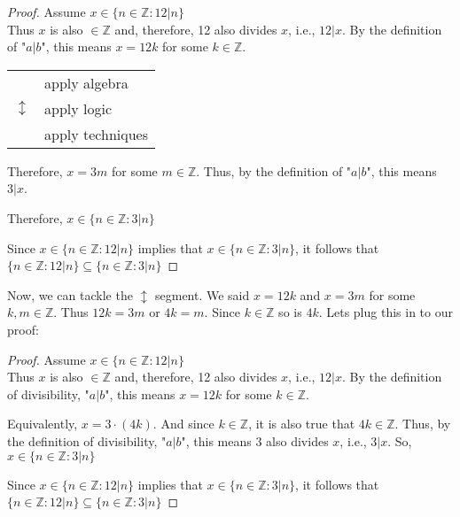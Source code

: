 \documentclass{amsart} %
\theoremstyle{definition} %
\theoremstyle{proposition} %
\theoremstyle{remark} %
\begin{document}
\begin{proof}
      Assume $x \in \{n \in \mathbb{Z}: 12|n \}$ \\
      Thus $x$ is also $\in \mathbb{Z}$ and, therefore, 12 also divides $x$, i.e., $12|x$. By the definition of "$a | b$", this means $x=12k$ for some $k \in \mathbb{Z}$.

      \begin{center}
      \begin{tabular}{r l}
            \multirow{3}{*}{\huge $\updownarrow$} & apply algebra \\ %
            & apply logic \\
            & apply techniques \\
      \end{tabular}
      \end{center}

      Therefore, $x = 3m$ for some $m \in \mathbb{Z}$. Thus, by the definition of "$a | b$", this means $3 | x$.

      Therefore, $x \in \{n \in \mathbb{Z} : 3|n \}$

      Since $x \in\{n \in \mathbb{Z}: 12|n \}$ implies that $x \in \{n \in \mathbb{Z} : 3|n \}$, it follows that \\ $\{n \in \mathbb{Z}: 12|n \} \subseteq \{n \in \mathbb{Z} : 3|n \}$

\end{proof}

Now, we can tackle the $\updownarrow$ segment. We said $x = 12k$ and $x = 3m$ for some $k, m \in \mathbb{Z}$. Thus $12k = 3m$ or $4k = m$. Since $k \in \mathbb{Z}$ so is $4k$. Lets plug this in to our proof:

\begin{proof}
      Assume $x \in \{n \in \mathbb{Z}: 12|n \}$ \\
      Thus $x$ is also $\in \mathbb{Z}$ and, therefore, 12 also divides $x$, i.e., $12|x$. By the definition of divisibility, "$a | b$", this means $x=12k$ for some $k \in \mathbb{Z}$.

      Equivalently, $x = 3\cdot(4k)$.
      And since $k \in \mathbb{Z}$, it is also true that $4k \in \mathbb{Z}$. Thus, by the definition of divisibility, "$a | b$", this means 3 also divides $x$, i.e., $3 | x$. So, $x \in \{n \in \mathbb{Z} : 3|n \}$

      Since $x \in\{n \in \mathbb{Z}: 12|n \}$ implies that $x \in \{n \in \mathbb{Z} : 3|n \}$, it follows that \\ $\{n \in \mathbb{Z}: 12|n \} \subseteq \{n \in \mathbb{Z} : 3|n \}$

\end{proof}
\end{document}
